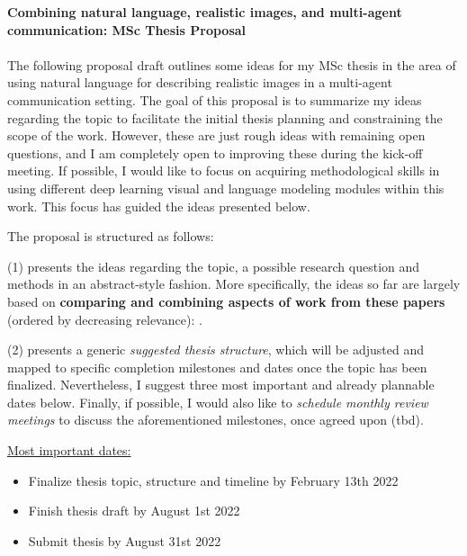 \documentclass[11pt,letterpaper]{article}
\renewcommand{\title}[1]{\textbf{#1}\\}
\newcommand{\authors}[1]{\iftoggle{anonymous}{\phantom{#1}}{#1}\\}
\begin{document}


\title{Combining natural language, realistic images, and multi-agent communication: MSc Thesis Proposal \newline}
\authors{\textit{January 11th 2022} \newline \newline By Polina Tsvilodub (ptsvilodub@uos.de), Osnabr\"uck University }

The following proposal draft outlines some ideas for my MSc thesis in the area of using natural language for describing realistic images in a multi-agent communication setting. The goal of this proposal is to summarize my ideas regarding the topic to facilitate the initial thesis planning and constraining the scope of the work. However, these are just rough ideas with remaining open questions, and I am completely open to improving these during the kick-off meeting. If possible, I would like to focus on acquiring methodological skills in using different deep learning visual and language modeling modules within this work. This focus has guided the ideas presented below.

The proposal is structured as follows:

(1) presents the ideas regarding the topic, a possible research question and methods in an abstract-style fashion. More specifically, the ideas so far are largely based on \textbf{comparing and combining aspects of work from these papers} (ordered by decreasing relevance): \cite{lazaridou2020multi, andreas2016reasoning, kim2021vilt}. 

(2) presents a generic \textit{suggested thesis structure}, which will be adjusted and mapped to specific completion milestones and dates once the topic has been finalized. Nevertheless, I suggest three most important and already plannable dates below. Finally, if possible, I would also like to \textit{schedule monthly review meetings} to discuss the aforementioned milestones, once agreed upon (tbd). 

\underline{Most important dates:}
\begin{itemize}
	\item Finalize thesis topic, structure and timeline by February 13th 2022
	\item Finish thesis draft by August 1st 2022
	\item Submit thesis by August 31st 2022
\end{itemize}
\end{document}
